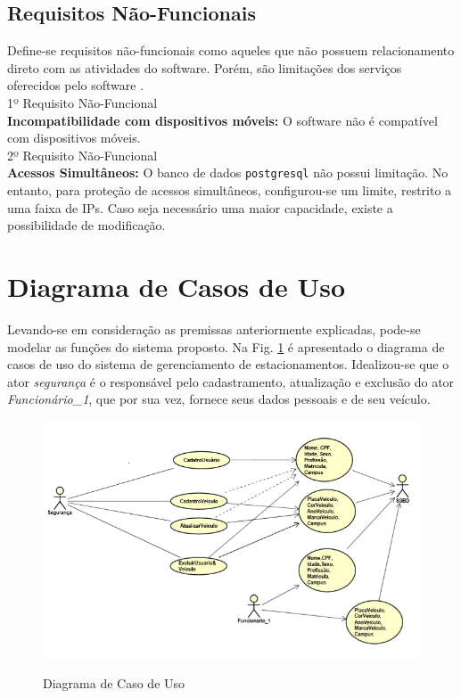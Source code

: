  \subsection{Requisitos Não-Funcionais}
 Define-se requisitos não-funcionais como aqueles que não possuem relacionamento direto com
 as atividades do software. Porém, são limitações dos serviços oferecidos pelo
 software \cite{rezende2006engenharia}.\\
 1º Requisito Não-Funcional\\
 \textbf{Incompatibilidade com dispositivos móveis:}
 O software não é compatível com dispositivos móveis.\\
 2º Requisito Não-Funcional\\
 \textbf{Acessos Simultâneos:}
 O banco de dados \texttt{postgresql} não possui limitação. No entanto, para proteção de acessos simultâneos, configurou-se um limite, restrito a uma faixa de IPs. Caso seja necessário uma maior capacidade, existe a possibilidade de modificação.
 
 \section{Diagrama de Casos de Uso}
 Levando-se em consideração as premissas anteriormente explicadas, pode-se modelar as funções do sistema proposto. Na Fig. \ref{figura:diagramaCasoUso_proj_vic} é apresentado o diagrama
 de casos de uso do sistema de gerenciamento de estacionamentos. Idealizou-se que o ator \textit{segurança} é o responsável pelo cadastramento, atualização e exclusão do ator \textit{Funcionário\_1}, que por sua vez, fornece seus dados pessoais e de seu veículo. 
 
 
 \begin{figure}[H]
 	\caption{Diagrama de Caso de Uso}
 	\centering %
 	\includegraphics[scale=0.85]{Figs/diagramaCasoUso_proj_vic.png} %
 	\label{figura:diagramaCasoUso_proj_vic}
 \end{figure}



